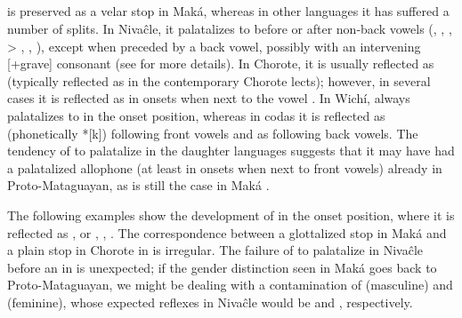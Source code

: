 \subsection{}\label{proto-k}
 is preserved as a velar stop in Maká, whereas in other languages it has suffered a number of splits. In Nivaĉle, it palatalizes to  before or after non-back vowels (, , ,  > , , ), except when preceded by a back vowel, possibly with an intervening [+grave] consonant (see  for more details). In Chorote, it is usually reflected as  (typically reflected as  in the contemporary Chorote lects); however, in several cases it is reflected as  in onsets when next to the vowel . In Wichí,  always palatalizes to  in the onset position, whereas in codas it is reflected as  (phonetically *[k]) following front vowels and as  following back vowels. The tendency of  to palatalize in the daughter languages suggests that it may have had a palatalized allophone (at least in onsets when next to front vowels) already in Proto-Mataguayan, as is still the case in Maká \citep[24]{AG89}.

The following examples show the development of  in the onset position, where it is reflected as ,  or , , . The correspondence between a glottalized stop in Maká and a plain stop in Chorote in  is irregular. The failure of  to palatalize in Nivaĉle before an  in  is unexpected; if the gender distinction seen in Maká goes back to Proto-Mataguayan, we might be dealing with a contamination of  (masculine) and  (feminine), whose expected reflexes in Nivaĉle would be  and , respectively.

\begin{exe}
    \ex \north
    \ex \demk \label{l-demk}
    \ex \tooln
    \ex \grove
    \ex \takeaway
    \ex \testicle
    \ex \tail
    \ex \fall
    \ex \redquebracho
    \ex \sendv
    \ex \feminine
    \ex \cactus
    \ex \neighbor
    \ex \elderbro
    \ex \eldersis
    \ex \hand
    \ex \roundkoy \label{k-roundkoy}
    \ex \leniosapl
    \ex \sunn
    \ex \answer
    \ex \grabwork
    \ex \eatkun
    \ex \heat
    \ex \meet
    \ex \sweat
    \ex \flu
    \ex \squash
    \ex \distrust
    \ex \mesh
    \ex \face
    \ex \eyebrow
    \ex \ant
    \ex \unclepl
\end{exe}

